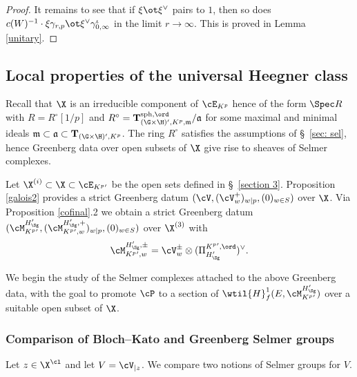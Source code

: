 \begin{proof}
It remains to see that if $\xi\ot \xi^{\vee}$ pairs to $1$, then so does $c(W)^{-1}\cdot \xi\gamma_{r, p}\ot \xi^{\vee}\gamma_{0, \infty}^{\iota}$ in the limit  $r\to \infty$.  This is proved in Lemma \ref{unitary}.
\end{proof}



\subsection{Local properties of the  universal Heegner class}
Recall that $\X$ is an irreducible component of $\cE_{K^{p}}$ hence of the form $\Spec R$ with $R=R^{\circ}[1/p ]$ and  $R^{\circ}= {\bf T}_{(\G\times \H)', K^{p}, \mathfrak{m}}^{{\rm sph}, \ord}/\mathfrak{a}$ for some maximal and minimal ideals $\mathfrak{m}\subset \mathfrak{a}\subset {\bf T}_{(\G\times \H)', K^{p}}$. The ring $R^{\circ}$ satisfies the assumptions of \S~\ref{sec: sel}, hence Greenberg data over open subsets of $\X$ give rise to sheaves of Selmer complexes.

Let $\X^{(i)}\subset \X\subset \cE_{K^{p}{}'}$ be the open sets defined in \S~\ref{section 3}.
Proposition \ref{galois2} provides  a strict Greenberg datum  $(\cV, (\cV_{w}^{+})_{w\vert p}, (0)_{w\in S})$ over $\X$. Via Proposition \ref{cofinal}.2 we obtain  a strict Greenberg datum $(\cM_{K^{p}{}'}^{{H_{\Sg}'}}, (\cM_{K^{p}{}', w}^{{H_{\Sg}'}, +})_{w\vert p}, (0)_{w\in S}) $ over $\X^{(3)}$ with
$$ \cM_{K^{p}{}', w}^{{H_{\Sg}'},\pm}= \cV_{w}^{\pm} \otimes ( \Pi^{K^{p}{}', \ord}_{{H_{\Sg}'}} )^{\vee} .$$

 We begin the study of the Selmer complexes attached to the above Greenberg data, with the goal to promote $\cP$ to a section  of $\wtil{H}^{1}_{f}({E}, \cM_{K^{p}{}'}^{{H_{\Sg}'}})$ over a suitable open subset of $\X$.

\subsubsection{Comparison of  Bloch--Kato and Greenberg Selmer groups}
 Let $z\in \X^{\cl}$ and let $V=\cV_{|z}$. We compare  two notions of Selmer groups for $V$.


